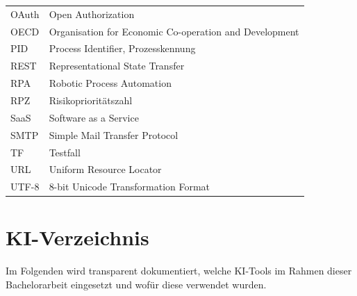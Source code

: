 \documentclass[a4paper,12pt]{article}
\begin{document}
\begin{tabularx}{\textwidth}{@{}p{2.2cm}X@{}}
    OAuth & Open Authorization \\
    OECD & Organisation for Economic Co-operation and Development \\
    PID & Process Identifier, Prozesskennung \\
    REST & Representational State Transfer \\
    RPA & Robotic Process Automation \\
    RPZ & Risikoprioritätszahl \\
    SaaS & Software as a Service \\
    SMTP & Simple Mail Transfer Protocol \\
    TF & Testfall \\
    URL & Uniform Resource Locator \\
    UTF-8 & 8-bit Unicode Transformation Format \\
\end{tabularx}
\endgroup

\clearpage
\section*{KI-Verzeichnis}
Im Folgenden wird transparent dokumentiert, welche KI-Tools im Rahmen dieser Bachelorarbeit eingesetzt und wofür diese verwendet wurden.
\end{document}
